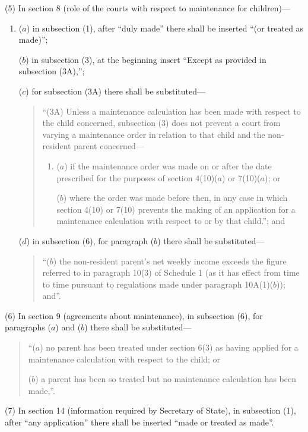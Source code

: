 \documentclass[12pt,a4paper]{article}
\begin{document}
(5) In section 8 (role of the courts with respect to maintenance for children)—
\begin{enumerate}\item[]
($a$) in subsection (1), after “duly made” there shall be inserted “(or treated as made)”;

($b$) in subsection (3), at the beginning insert “Except as provided in subsection (3A),”;

($c$) for subsection (3A)  there shall be substituted—
\begin{quotation}
“(3A) Unless a maintenance calculation has been made with respect to the child concerned, subsection (3)  does not prevent a court from varying a maintenance order in relation to that child and the non-resident parent concerned—
\begin{enumerate}\item[]
($a$) if the maintenance order was made on or after the date prescribed for the purposes of section 4(10)($a$)  or 7(10)($a$); or

($b$) where the order was made before then, in any case in which section 4(10)  or 7(10)  prevents the making of an application for a maintenance calculation with respect to or by that child.”; and
\end{enumerate}
\end{quotation}

($d$) in subsection (6), for paragraph ($b$)  there shall be substituted—
\begin{quotation}
“($b$) the non-resident parent’s net weekly income exceeds the figure referred to in paragraph 10(3)  of Schedule 1 (as it has effect from time to time pursuant to regulations made under paragraph 10A(1)($b$)); and”.
\end{quotation}
\end{enumerate}

(6) In section 9 (agreements about maintenance), in subsection (6), for paragraphs ($a$)  and ($b$)  there shall be substituted—
\begin{quotation}
“($a$) no parent has been treated under section 6(3)  as having applied for a maintenance calculation with respect to the child; or

($b$) a parent has been so treated but no maintenance calculation has been made,”.
\end{quotation}

(7) In section 14 (information required by Secretary of State), in subsection (1), after “any application” there shall be inserted “made or treated as made”.
\end{document}
